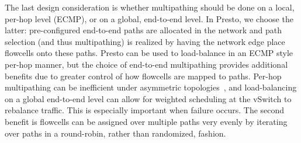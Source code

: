 
The last design consideration is whether multipathing should be done on a local, per-hop level (\eg{}ECMP), or
on a global, end-to-end level. In Presto, we choose the latter: pre-configured end-to-end paths
are allocated in the network and path selection (and thus multipathing) is realized by having the network edge
place flowcells onto these paths. 
Presto can be used to load-balance in an ECMP style per-hop manner, but the choice of end-to-end 
multipathing provides additional benefits due to greater control of how flowcells are mapped to
paths. Per-hop multipathing can be inefficient
under asymmetric topologies~\cite{wcmp}, and load-balancing on a global end-to-end level can allow
for weighted scheduling at the vSwitch to rebalance traffic. This is especially important when failure occurs.
The second benefit is flowcells can be assigned over multiple paths very evenly
by iterating over paths in a round-robin, rather than randomized, fashion. 

